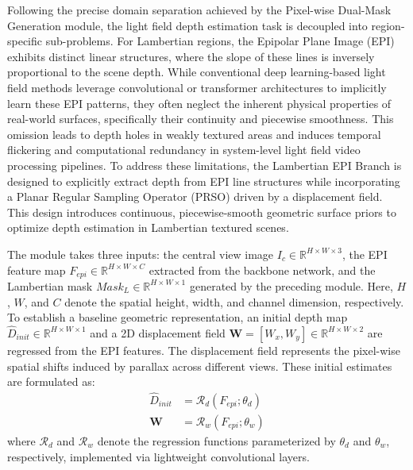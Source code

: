 \documentclass[lettersize,journal]{IEEEtran}
\begin{document}
Following the precise domain separation achieved by the Pixel-wise Dual-Mask Generation module, the light field depth estimation task is decoupled into region-specific sub-problems. For Lambertian regions, the Epipolar Plane Image (EPI) exhibits distinct linear structures, where the slope of these lines is inversely proportional to the scene depth. While conventional deep learning-based light field methods leverage convolutional or transformer architectures to implicitly learn these EPI patterns, they often neglect the inherent physical properties of real-world surfaces, specifically their continuity and piecewise smoothness. This omission leads to depth holes in weakly textured areas and induces temporal flickering and computational redundancy in system-level light field video processing pipelines. To address these limitations, the Lambertian EPI Branch is designed to explicitly extract depth from EPI line structures while incorporating a Planar Regular Sampling Operator (PRSO) driven by a displacement field. This design introduces continuous, piecewise-smooth geometric surface priors to optimize depth estimation in Lambertian textured scenes.

The module takes three inputs: the central view image $I_c \in \mathbb{R}^{H \times W \times 3}$, the EPI feature map $F_{epi} \in \mathbb{R}^{H \times W \times C}$ extracted from the backbone network, and the Lambertian mask $Mask_L \in \mathbb{R}^{H \times W \times 1}$ generated by the preceding module. Here, $H$, $W$, and $C$ denote the spatial height, width, and channel dimension, respectively. To establish a baseline geometric representation, an initial depth map $\hat{D}_{init} \in \mathbb{R}^{H \times W \times 1}$ and a 2D displacement field $\mathbf{W} = [W_x, W_y] \in \mathbb{R}^{H \times W \times 2}$ are regressed from the EPI features. The displacement field represents the pixel-wise spatial shifts induced by parallax across different views. These initial estimates are formulated as:
\begin{align}
\hat{D}_{init} &= \mathcal{R}_d(F_{epi}; \theta_d) \\
\mathbf{W} &= \mathcal{R}_w(F_{epi}; \theta_w)
\end{align}
where $\mathcal{R}_d$ and $\mathcal{R}_w$ denote the regression functions parameterized by $\theta_d$ and $\theta_w$, respectively, implemented via lightweight convolutional layers.
\end{document}
